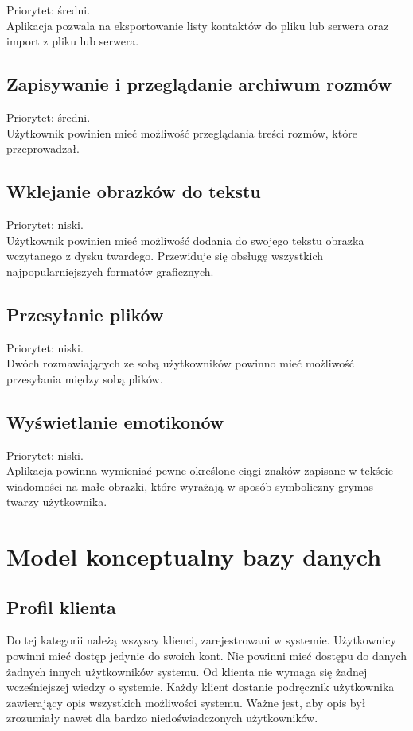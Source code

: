 \documentclass[a4paper,12pt]{article}
\begin{document}
Priorytet: średni.\\

Aplikacja pozwala na eksportowanie listy kontaktów do pliku lub serwera oraz import z pliku lub serwera.
\subsection[Zapisywanie i przeglądanie archiwum rozmów]{Zapisywanie i przeglądanie archiwum rozmów}
Priorytet: średni.\\

Użytkownik powinien mieć możliwość przeglądania treści rozmów, które przeprowadzał.

\subsection[Wklejanie obrazków do tekstu]{Wklejanie obrazków do tekstu}

Priorytet: niski.\\

Użytkownik powinien mieć możliwość dodania do swojego tekstu obrazka wczytanego z dysku twardego.
Przewiduje się obsługę wszystkich najpopularniejszych formatów graficznych.
\subsection[Przesyłanie plików]{Przesyłanie plików}

Priorytet: niski.\\

Dwóch rozmawiających ze sobą użytkowników powinno mieć możliwość przesyłania między sobą plików.
\subsection[Wyświetlanie emotikonów]{Wyświetlanie emotikonów}

Priorytet: niski.\\

Aplikacja powinna wymieniać pewne określone ciągi znaków zapisane w tekście wiadomości na małe obrazki, które
wyrażają w sposób symboliczny grymas twarzy użytkownika.

\section[Model konceptualny bazy danych]{Model konceptualny bazy danych}
\subsection[Profil klienta]{Profil klienta}
Do tej kategorii należą wszyscy klienci, zarejestrowani w systemie.
Użytkownicy powinni mieć dostęp jedynie do swoich kont. Nie powinni
mieć dostępu do danych żadnych innych użytkowników systemu.
Od klienta nie wymaga się żadnej wcześniejszej wiedzy o systemie. Każdy klient dostanie
podręcznik użytkownika zawierający opis wszystkich możliwości systemu.
Ważne jest, aby opis był zrozumiały nawet dla bardzo niedoświadczonych użytkowników.
\end{document}
